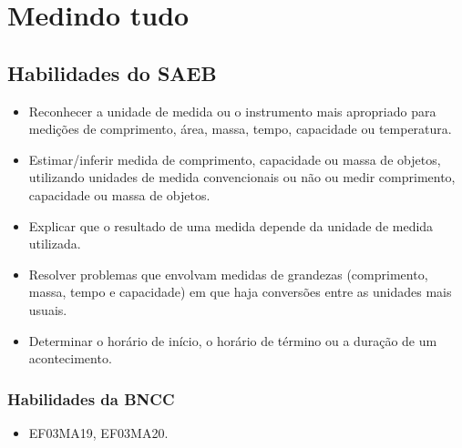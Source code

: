 

\chapter{Medindo tudo}

\enlargethispage{3\baselineskip}

\section*{Habilidades do SAEB}

\begin{itemize}
\item Reconhecer a unidade de medida ou o instrumento mais apropriado para
medições de comprimento, área, massa, tempo, capacidade ou temperatura.

\item Estimar/inferir medida de comprimento, capacidade ou massa de objetos,
utilizando unidades de medida convencionais ou não ou medir comprimento,
capacidade ou massa de objetos.

\item Explicar que o resultado de uma medida depende da unidade de medida
utilizada.

\item Resolver problemas que envolvam medidas de grandezas (comprimento,
massa, tempo e capacidade) em que haja conversões entre as unidades mais
usuais.

\item Determinar o horário de início, o horário de término ou a duração de
um acontecimento.
\end{itemize}

\subsection{Habilidades da BNCC}

\begin{itemize}
\item EF03MA19, EF03MA20.
\end{itemize}

